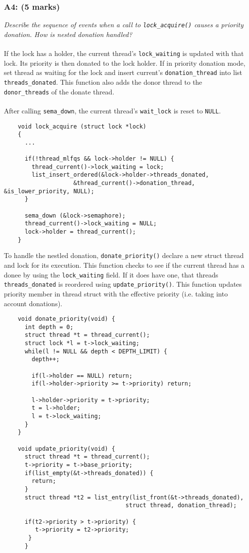 \documentclass{article}
\begin{document}
\subsubsection*{A4: (5 marks) }
\textit{Describe the sequence of events when a call to \texttt{lock\_acquire()} causes a priority donation. How is nested donation handled?}
\\ \\
If the lock has a holder, the current thread's \texttt{lock\_waiting} is updated with that lock.
Its priority is then donated to the lock holder. If in priority donation mode, set thread as waiting for the lock and insert current's \texttt{donation\_thread} into list \texttt{threads\_donated}. This function also adds the donor thread to
the \texttt{donor\_threads} of the donate thread.
\\ \\
After calling \texttt{sema\_down}, the current thread's \texttt{wait\_lock} is reset to \texttt{NULL}.

\begin{lstlisting}
    void lock_acquire (struct lock *lock)
    {
      ...

      if(!thread_mlfqs && lock->holder != NULL) {
        thread_current()->lock_waiting = lock;
        list_insert_ordered(&lock->holder->threads_donated,
                    &thread_current()->donation_thread, &is_lower_priority, NULL);
      }

      sema_down (&lock->semaphore);
      thread_current()->lock_waiting = NULL;
      lock->holder = thread_current();
    }
\end{lstlisting}

To handle the nestled donation, \texttt{donate\_priority()} declare a new struct thread and lock for  its execution. This function checks to see if the current thread has a donee by
using the \texttt{lock\_waiting} field. If it does have one, that threads \texttt{threads\_donated}
is reordered using \texttt{update\_priority()}. This function updates priority member in thread struct with the effective priority (i.e. taking into account donations).

\begin{lstlisting}
    void donate_priority(void) {
      int depth = 0;
      struct thread *t = thread_current();
      struct lock *l = t->lock_waiting;
      while(l != NULL && depth < DEPTH_LIMIT) {
        depth++;

        if(l->holder == NULL) return;
        if(l->holder->priority >= t->priority) return;

        l->holder->priority = t->priority;
        t = l->holder;
        l = t->lock_waiting;
      }
    }

    void update_priority(void) {
      struct thread *t = thread_current();
      t->priority = t->base_priority;
      if(list_empty(&t->threads_donated)) {
        return;
      }
      struct thread *t2 = list_entry(list_front(&t->threads_donated),
                                   struct thread, donation_thread);

      if(t2->priority > t->priority) {
         t->priority = t2->priority;
       }
      }
\end{lstlisting}
\end{document}
